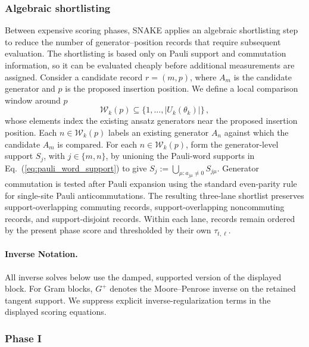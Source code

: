 \documentclass[
  reprint,
  amsmath,
  amssymb,
  aps,
  pra,
  nofootinbib,
  superscriptaddress,
  floatfix
]{revtex4-2}
\begin{document}
\subsubsection{Algebraic shortlisting}
%
Between expensive scoring phases, \textsc{SNAKE} applies an algebraic shortlisting step to reduce the number of generator--position records that require subsequent evaluation. The shortlisting is based only on Pauli support and commutation information, so it can be evaluated cheaply before additional measurements are assigned. Consider a candidate record \(r=(m,p)\), where \(A_m\) is the candidate generator and \(p\) is the proposed insertion position. We define a local comparison window around \(p\)
\[
\mathcal W_k(p)\subseteq \{1,\ldots,|U_k(\theta_k)|\}\,,
\]
whose elements index the existing ansatz generators near the proposed insertion position. Each \(n\in\mathcal W_k(p)\) labels an existing generator \(A_n\) against which the candidate \(A_m\) is compared.
For each $n\in\mathcal W_k(p)$, form the generator-level support $S_j$, with $j\in\{m,n\}$, by unioning the Pauli-word supports in Eq.~(\ref{eq:pauli_word_support}) to give
$S_j:=\bigcup_{\mu:a_{j\mu}\ne0}S_{j\mu}$.
Generator commutation is tested after Pauli expansion using the standard even-parity rule for single-site Pauli anticommutations. The resulting three-lane shortlist preserves support-overlapping commuting records, support-overlapping noncommuting records, and support-disjoint records. Within each lane, records remain ordered by the present phase score and thresholded by their own $\tau_{t,\ell}$.

\paragraph*{Inverse Notation.}
All inverse solves below use the damped, supported version of the displayed block. For Gram blocks, \(G^+\) denotes the Moore--Penrose inverse on the retained tangent support. We suppress explicit inverse-regularization terms in the displayed scoring equations.

\subsubsection{Phase I}
\end{document}
